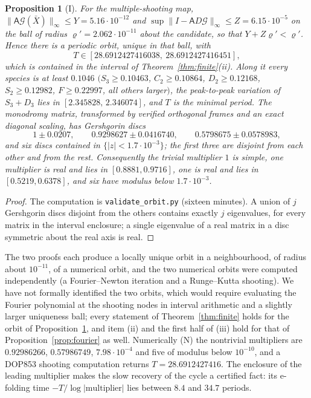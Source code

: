 \documentclass[11pt,a4paper]{article}
\theoremstyle{plain}
\newtheorem{proposition}[theorem]{Proposition}
\theoremstyle{definition}
\theoremstyle{remark}
\newcommand{\norm}[1]{\lVert#1\rVert}
\newcommand{\abs}[1]{\lvert#1\rvert}
\newcommand{\evI}{\textsf{I}}
\newcommand{\evN}{\textsf{N}}
\begin{document}
\begin{proposition}[\evI]\label{prop:shooting}
For the multiple-shooting map, $\norm{\mathsf A\mathcal G(\bar X)}_\infty\le Y=5.16\cdot10^{-12}$ and $\sup\norm{I-\mathsf AD\mathcal G}_\infty\le Z=6.15\cdot10^{-5}$ on the ball of radius $\varrho'=2.062\cdot10^{-11}$ about the candidate, so that $Y+Z\varrho'<\varrho'$. Hence there is a periodic orbit, unique in that ball, with
\[
T\in[28.6912427416038,\ 28.6912427416451],
\]
which is contained in the interval of Theorem~\ref{thm:finite}(ii). Along it every species is at least $0.1046$ $(S_3\ge0.10463$, $C_2\ge0.10864$, $D_2\ge0.12168$, $S_2\ge0.12982$, $F\ge0.22997$, all others larger$)$, the peak-to-peak variation of $S_3+D_3$ lies in $[2.345828,\,2.346074]$, and $T$ is the minimal period. The monodromy matrix, transformed by verified orthogonal frames and an exact diagonal scaling, has Gershgorin discs
\[
1\pm0.0207,\qquad0.9298627\pm0.0416740,\qquad0.5798675\pm0.0578983,
\]
and six discs contained in $\{\abs z<1.7\cdot10^{-3}\}$; the first three are disjoint from each other and from the rest. Consequently the trivial multiplier $1$ is simple, one multiplier is real and lies in $[0.8881,0.9716]$, one is real and lies in $[0.5219,0.6378]$, and six have modulus below $1.7\cdot10^{-3}$.
\end{proposition}
\begin{proof}
The computation is \texttt{validate\_orbit.py} (sixteen minutes). A union of $j$ Gershgorin discs disjoint from the others contains exactly $j$ eigenvalues, for every matrix in the interval enclosure; a single eigenvalue of a real matrix in a disc symmetric about the real axis is real.
\end{proof}

The two proofs each produce a locally unique orbit in a neighbourhood, of radius about $10^{-11}$, of a numerical orbit, and the two numerical orbits were computed independently (a Fourier--Newton iteration and a Runge--Kutta shooting). We have not formally identified the two orbits, which would require evaluating the Fourier polynomial at the shooting nodes in interval arithmetic and a slightly larger uniqueness ball; every statement of Theorem~\ref{thm:finite} holds for the orbit of Proposition~\ref{prop:shooting}, and item (ii) and the first half of (iii) hold for that of Proposition~\ref{prop:fourier} as well. Numerically (\evN) the nontrivial multipliers are $0.92986266$, $0.57986749$, $7.98\cdot10^{-4}$ and five of modulus below $10^{-10}$, and a DOP853 shooting computation returns $T=28.6912427416$. The enclosure of the leading multiplier makes the slow recovery of the cycle a certified fact: its e-folding time $-T/\log\abs{\text{multiplier}}$ lies between $8.4$ and $34.7$ periods.
\end{document}
